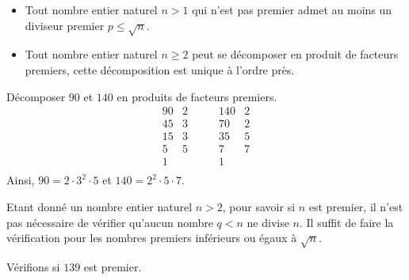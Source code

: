             \begin{prop}
                  \begin{itemize}
                        \item Tout nombre entier naturel $n > 1$ qui n'est pas premier 
                              admet au moins un diviseur premier $p \leq \sqrt{n}$.
                        \item Tout nombre entier naturel $n \geq 2$ peut se d\'ecomposer en produit de facteurs premiers,
                              cette d\'ecomposition est unique \`a l'ordre pr\`es.
                  \end{itemize}
                  \begin{ex}
                        D\'ecomposer $90$ et $140$ en produits de facteurs premiers.
                        \[
                                    \begin{array}{r|l}
                                           90 & 2 \\
                                           45 & 3 \\
                                           15 & 3 \\
                                            5 & 5 \\
                                            1 &   \\
                                    \end{array}
                                    \qquad
                                    \begin{array}{r|l}
                                          140 & 2 \\
                                           70 & 2 \\
                                           35 & 5 \\
                                            7 & 7 \\
                                            1 &   \\
                                    \end{array}
                        \]
                                    Ainsi, $90 = 2 \cdot 3^2 \cdot 5$ et $140 = 2^2 \cdot 5 \cdot 7$.
                  \end{ex}
            Etant donn\'e un nombre entier naturel $n > 2$,
            pour savoir si $n$ est premier,
            il n'est pas n\'ecessaire de v\'erifier qu'aucun nombre $q < n$ ne divise $n$.
            Il suffit de faire la v\'erification pour les nombres premiers inf\'erieurs ou \'egaux \`a $\sqrt{n}$.
                  \begin{ex}
                        V\'erifions si $139$ est premier.
                        

\end{ex}
\end{prop}
